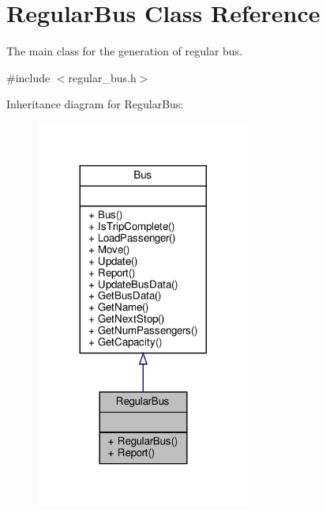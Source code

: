 \hypertarget{classRegularBus}{}\section{Regular\+Bus Class Reference}
\label{classRegularBus}


The main class for the generation of regular bus.  




{\ttfamily \#include $<$regular\+\_\+bus.\+h$>$}



Inheritance diagram for Regular\+Bus\+:
\nopagebreak
\begin{figure}[H]
\begin{center}
\leavevmode
\includegraphics[width=200pt]{classRegularBus__inherit__graph}
\end{center}
\end{figure}


